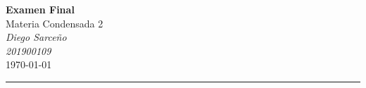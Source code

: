 




%


\textcolor{DS_Black}{
\begin{minipage}{0.85\textwidth}
    \begin{center}
        \textbf{\Large Examen Final}\\
        \vspace{5pt}
        Materia Condensada 2 \\
        \vspace{20pt}
        \textit{Diego Sarceño} \\
        \vspace{5pt}
        \footnotesize{\textit{201900109}} \\
        \vspace{5pt}
        \today
    \end{center}
\end{minipage}
\vspace{10pt}
\hrule
}